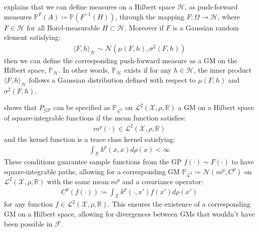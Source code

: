 \documentclass{article}
\newcommand{\GP}{\operatorname{\mathcal{GP}}}
\numberwithin{equation}{section}
\begin{document}
\cite{wild2022generalized} explains that we can define measures on a Hilbert space $\mathcal{H}$, as push-forward measures $\mathbb{P}^{F}(A) \coloneqq \mathbb{P}(F^{-1}(H))$, through the mapping $F: \Omega \rightarrow \mathcal{H}$, where $F \in \mathcal{H}$ for all Borel-measurable $H \subset \mathcal{H}$. Moreover if $F$ is a Gaussian random element satisfying:
\begin{align}
    \langle F, h \rangle_\mathcal{H} \sim \mathcal{N}\left(\mu(F, h), \sigma^2(F, h)\right)
\label{gre}
\end{align}
then we can define the corresponding push-forward measure as a GM on the Hilbert space, $\mathbb{P}_{\mathcal{H}}$. In other words, $\mathbb{P}_{\mathcal{H}}$ exists if for any $h \in \mathcal{H}$, the inner product $\langle F, h \rangle_\mathcal{H}$ follows a Gaussian distribution defined with respect to $\mu(F, h)$ and $\sigma^2(F, h)$.

\cite{wild2022generalized} shows that $P_{\GP}$ can be specified as $\mathbb{P}_{\mathcal{L}^2}$ on $\mathcal{L}^2(\mathcal{X}, \rho, \mathbb{R})$ a GM on a Hilbert space of square-integrable functions if the mean function satisfies:
\begin{align}
    \label{smooth-mean-function-condition}
    m^p(\cdot) \in \mathcal{L}^2(\mathcal{X}, \rho, \mathbb{R})
\end{align}
and the kernel function is a trace class kernel satisfying:
\begin{align}
    \int_{\mathcal{X}} k^p(x, x) d\rho(x) < \infty
    \label{trace-kernel-condition}
\end{align}
These conditions guarantee sample functions from the GP $f(\cdot) \sim F(\cdot)$ to have square-integrable paths, allowing for a corresponding GM $\mathbb{P}_{\mathcal{L}^2} \coloneqq \mathcal{N}(m^p, C^p)$ on $\mathcal{L}^2(\mathcal{X}, \rho, \mathbb{R})$ with the same mean $m^p$ and a covariance operator:
\begin{align}
    C^p(f(\cdot)) \coloneqq \int_{\mathcal{X}} k^p(\cdot, x')f(x')d \rho(x')
    \label{gm-covariance-operator}
\end{align}
for any function $f \in \mathcal{L}^2(\mathcal{X}, \rho, \mathbb{R})$. This ensures the existence of a corresponding GM on a Hilbert space, allowing for divergences between GMs that wouldn't have been possible in $\mathcal{F}$.
\end{document}
